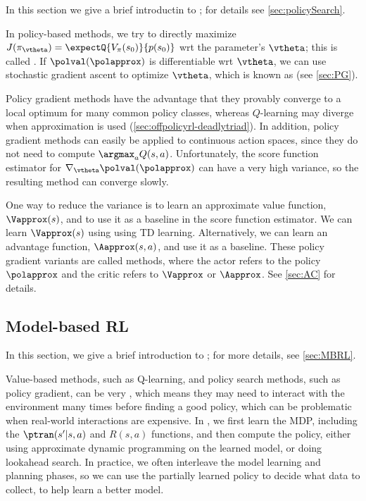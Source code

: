 In this section we give a brief introductin
to ; for details see  \cref{sec:policySearch}.

In policy-based methods,
we try to directly maximize $J(\pi_{\vtheta})=\expectQ{V_{\pi}(s_0)}{p(s_0)}$
wrt the parameter's $\vtheta$;
this is called .
If $\polval(\polapprox)$ is differentiable wrt $\vtheta$,
we can use stochastic gradient ascent to optimize
$\vtheta$, which is known as
 (see \cref{sec:PG}).

Policy gradient methods have the advantage that
they provably converge to a local optimum
for many common policy classes,
whereas $Q$-learning may diverge
when approximation is used
(\cref{sec:offpolicyrl-deadlytriad}).
In addition, policy gradient methods can easily be applied to
continuous action spaces, 
since they do not need to compute $\argmax_a Q(s,a)$.
Unfortunately,
the score function estimator
for $\nabla_{\vtheta} \polval(\polapprox)$ can have a very high 
variance, so the resulting method can converge slowly.

One way to reduce the variance is to learn
an approximate value function, $\Vapprox(s)$,
and to use it as a baseline
in the score function estimator.
We can learn $\Vapprox(s)$ using 
using TD learning.
Alternatively, we can learn an advantage function,
$\Aapprox(s,a)$, and use it as a baseline.
These policy gradient variants are called
 methods,
where the actor refers to the policy $\polapprox$
and the critic refers to $\Vapprox$ or $\Aapprox$.
See \cref{sec:AC} for details.



\subsection{Model-based RL}

In this section, we give a brief introduction to ;
for more details, see
\cref{sec:MBRL}.

Value-based methods, such as Q-learning,
and policy search methods, such as policy gradient,
can be very ,
which means they may need to interact with the environment many times
before finding a good policy,
which can be problematic when real-world interactions are expensive.
In ,
we first learn the MDP,
including  the $\ptran(s'|s,a)$ and $R(s,a)$ functions,
and then compute the policy, either using approximate dynamic programming
on the learned model, or doing lookahead search.
In practice, we often interleave the model learning
and planning phases,
so we can use the partially learned policy to decide
what data to collect, to help learn a better model.

